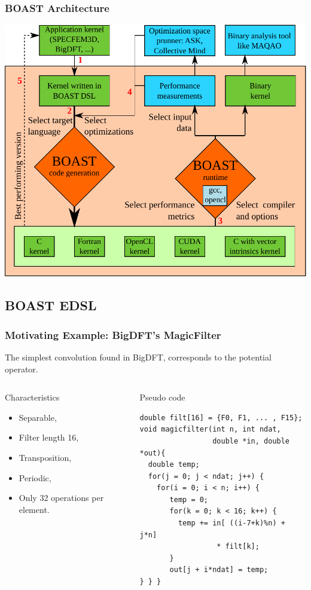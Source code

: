 \documentclass{beamer}
\begin{document}
\begin{frame}
\frametitle{BOAST Architecture}
 \begin{center}
   \includegraphics[scale=0.5]{BOAST_Workflow}
 \end{center}
\end{frame}

\subsection{BOAST EDSL}

\begin{frame}[fragile]
\frametitle{Motivating Example: BigDFT's MagicFilter}
The simplest convolution found in BigDFT, corresponds to the potential operator.
\begin{columns}
\column{4cm}
\begin{block}{Characteristics}
\begin{itemize}
\item Separable,
\item Filter length 16,
\item Transposition,
\item Periodic,
\item Only 32 operations per element.
\end{itemize}
\end{block}
\column{6.2cm}
\begin{block}{Pseudo code}
\tiny
\lstset{style=BC}
\begin{lstlisting}
double filt[16] = {F0, F1, ... , F15};
void magicfilter(int n, int ndat, 
                 double *in, double *out){
  double temp;
  for(j = 0; j < ndat; j++) {
    for(i = 0; i < n; i++) {
       temp = 0;
       for(k = 0; k < 16; k++) {
         temp += in[ ((i-7+k)%n) + j*n] 
                  * filt[k];
       }
       out[j + i*ndat] = temp;
} } }
\end{lstlisting}
\end{block}
\end{columns}
\end{frame}
\end{document}
